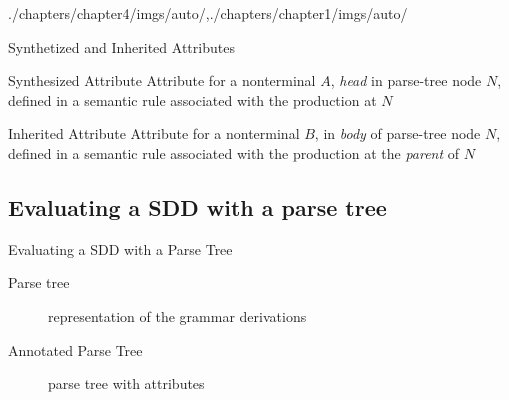 \begin{graphicspathcontext}{{./chapters/chapter4/imgs/auto/},{./chapters/chapter1/imgs/auto/}}
\begin{bibunit}[apalike]
\begin{frame}{Synthetized and Inherited Attributes}
	\begin{definitionblock}{Synthesized Attribute}
		Attribute for a nonterminal $A$, \emph{head} in parse-tree node $N$, defined in a semantic rule associated with the production at $N$
	\end{definitionblock}
	\vspace{.5cm}
	\begin{definitionblock}{Inherited Attribute}
		Attribute for a nonterminal $B$, in \emph{body} of parse-tree node $N$, defined in a semantic rule associated with the production at the \emph{parent} of $N$
	\end{definitionblock}
\end{frame}

\subsection{Evaluating a SDD with a parse tree}
\subsectiontableofcontentslide

\begin{frame}{Evaluating a SDD with a Parse Tree}
	\vspace{.5cm}
	\begin{description}
	\item[Parse tree] representation of the grammar derivations
	\item[Annotated Parse Tree] parse tree with attributes
	\end{description}
	\vspace{.5cm}
	\vspace{.5cm}
\end{frame}


\end{bibunit}
\end{graphicspathcontext}
